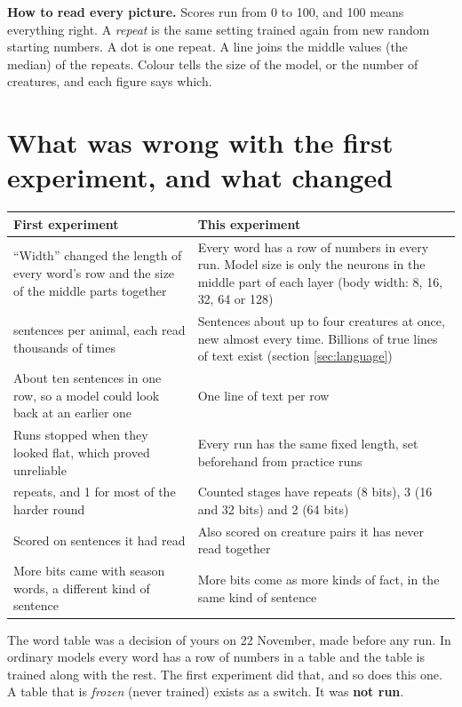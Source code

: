 \textbf{How to read every picture.} Scores run from 0 to 100, and 100 means everything right.
A \emph{repeat} is the same setting trained again from new random starting numbers. A dot is one
repeat. A line joins the middle values (the median) of the repeats. Colour tells the size of the
model, or the number of creatures, and each figure says which.

\section{What was wrong with the first experiment, and what changed}\label{sec:changes}

\begin{center}\small
\begin{tabularx}{\textwidth}{@{}>{\raggedright\arraybackslash}p{}X@{}}
\toprule
First experiment & This experiment\\
\midrule
``Width'' changed the length of every word's row and the size of the middle parts together
& Every word has a row of \N{rule.columns} numbers in every run. Model size is only the
neurons in the middle part of each layer (body width: 8, 16, 32, 64 or 128)\\
20 sentences per animal, each read thousands of times
& Sentences about up to four creatures at once, new almost every time. Billions of true lines
of text exist (section \ref{sec:language})\\
About ten sentences in one row, so a model could look back at an earlier one
& One line of text per row\\
Runs stopped when they looked flat, which proved unreliable
& Every run has the same fixed length, set beforehand from practice runs\\
3 repeats, and 1 for most of the harder round
& Counted stages have \N{rule.repeats} repeats (8 bits), 3 (16 and 32 bits) and 2 (64 bits)\\
Scored on sentences it had read
& Also scored on creature pairs it has never read together\\
More bits came with season words, a different kind of sentence
& More bits come as more kinds of fact, in the same kind of sentence\\
\bottomrule
\end{tabularx}
\end{center}

The word table was a decision of yours on 22 November, made before any run. In ordinary models
every word has a row of numbers in a table and the table is trained along with the rest. The
first experiment did that, and so does this one. A table that is \emph{frozen} (never trained)
exists as a switch. It was \textbf{not run}.

